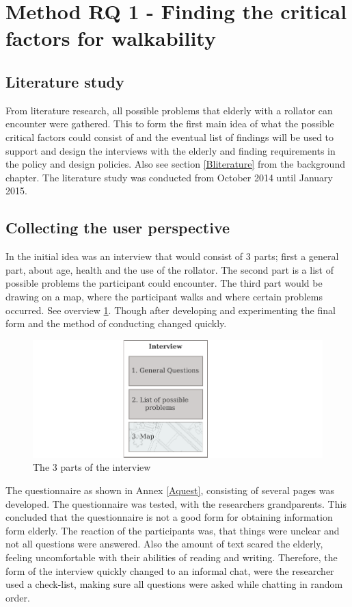 \section{Method RQ 1 - Finding the critical factors for walkability}\label{rq1}
\subsection{Literature study}
From literature research, all possible problems that elderly with a rollator can encounter were gathered. This to form the first main idea of what the possible critical factors could consist of and the eventual list of findings will be used to support and design the interviews with the elderly and finding requirements in the policy and design policies. Also see section \ref{Bliterature} from the background chapter. The literature study was conducted from October 2014 until January 2015. 

\subsection{Collecting the user perspective}
In the initial idea was an interview that would consist of 3 parts; first a general part, about age, health and the use of the rollator. The second part is a list of possible problems the participant could encounter. The third part would be drawing on a map, where the participant walks and where certain problems occurred. See overview \ref{interview}. Though after developing and experimenting the final form and the method of conducting changed quickly. 

\begin{figure}[h]
\includegraphics[width=\textwidth]{img/M_interview.pdf}
\centering
\caption{The 3 parts of the interview \label{interview}}
\end{figure}

The questionnaire as shown in Annex \ref{Aquest}, consisting of several pages was developed. The questionnaire was tested, with the researchers grandparents. This concluded that the questionnaire is not a good form for obtaining information form elderly. The reaction of the participants was, that things were unclear and not all questions were answered. Also the amount of text scared the elderly, feeling uncomfortable with their abilities of reading and writing. Therefore, the form of the interview quickly changed to an informal chat, were the researcher used a check-list, making sure all questions were asked while chatting in random order.

